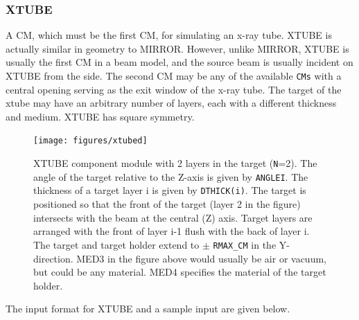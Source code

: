 \documentclass[12pt,twoside]{article}
\begin{document}
\begin{small}

\end{small}


\newpage
\subsubsection{XTUBE}
\renewcommand{\rightmark}{XTUBE CM}

A CM, which must be the first CM, for simulating an x-ray tube.  XTUBE is actually
similar in geometry to MIRROR.  However, unlike MIRROR, XTUBE is usually
the first CM in a beam model, and the source beam is usually incident on XTUBE
from the side.  The second CM may be any of the available  \verb+CMs+ with a
central opening serving as the exit
window of the x-ray tube.  The target of the xtube may
have an arbitrary number of layers, each with a different thickness and
medium.  XTUBE has square
symmetry.

\begin{figure}[htbp]
\begin{center}
\leavevmode
\mbox{}\hspace{0cm}
\texttt{[image: figures/xtubed]}
\caption[XTUBE CM geometry.]
{XTUBE component module with 2 layers in the target ({\tt N}=2).
The angle of the target relative to the Z-axis is given by {\tt ANGLEI}.  The
thickness of a target layer i is given by {\tt DTHICK(i)}.  The target is
positioned so that the front of the target (layer 2 in the figure)
intersects with the beam at the central (Z) axis.  Target layers are
arranged with the front of layer i-1 flush with the back of layer i.
The target and target holder extend to $\pm$ {\tt RMAX\_CM} in the Y-direction.
MED3 in the figure above would usually be air or vacuum, but could be any
material.  MED4 specifies the material of the target holder.}
\label{fig_XTUBED}
\end{center}
\end{figure}
\clearpage

The input format for XTUBE and a sample input are given below.

\begin{small}

\end{small}
\end{document}
